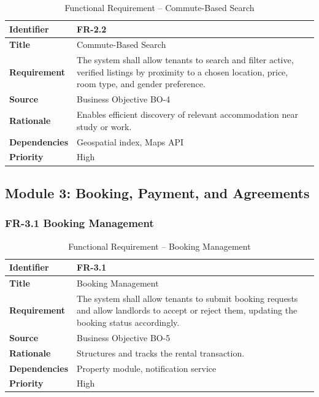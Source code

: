 \begin{table}[h]
\centering
\caption{Functional Requirement -- Commute-Based Search}

\begin{tabularx}{\textwidth}{|>{\raggedright\arraybackslash}p{3cm}|X|}
\hline
\textbf{Identifier} & FR-2.2 \\
\hline
\textbf{Title} & Commute-Based Search \\
\hline
\textbf{Requirement} & The system shall allow tenants to search and filter active, verified listings by proximity to a chosen location, price, room type, and gender preference. \\
\hline
\textbf{Source} & Business Objective BO-4 \\
\hline
\textbf{Rationale} & Enables efficient discovery of relevant accommodation near study or work. \\
\hline
\textbf{Dependencies} & Geospatial index, Maps API \\
\hline
\textbf{Priority} & High \\
\hline
\end{tabularx}

\end{table}

\subsection{Module 3: Booking, Payment, and Agreements}

\subsubsection{FR-3.1 Booking Management}

\begin{table}[h]
\centering
\caption{Functional Requirement -- Booking Management}

\begin{tabularx}{\textwidth}{|>{\raggedright\arraybackslash}p{3cm}|X|}
\hline
\textbf{Identifier} & FR-3.1 \\
\hline
\textbf{Title} & Booking Management \\
\hline
\textbf{Requirement} & The system shall allow tenants to submit booking requests and allow landlords to accept or reject them, updating the booking status accordingly. \\
\hline
\textbf{Source} & Business Objective BO-5 \\
\hline
\textbf{Rationale} & Structures and tracks the rental transaction. \\
\hline
\textbf{Dependencies} & Property module, notification service \\
\hline
\textbf{Priority} & High \\
\hline
\end{tabularx}

\end{table}

